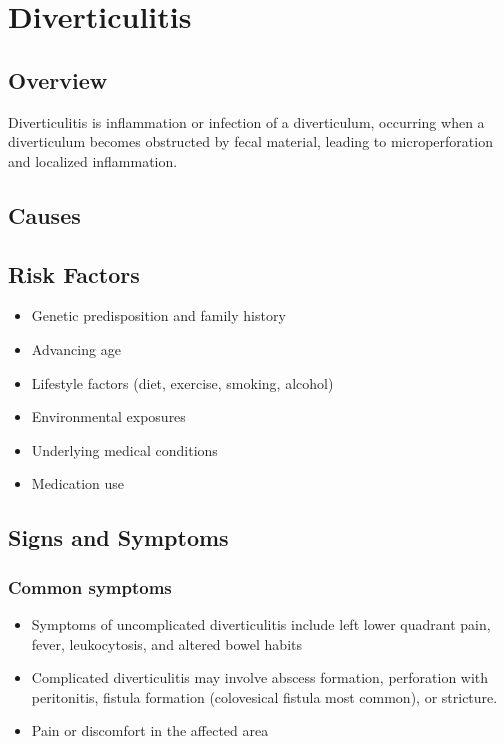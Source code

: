 \chapter{Diverticulitis}
\label{sec:Diverticulitis}

\section{Overview}
Diverticulitis is inflammation or infection of a diverticulum, occurring when a diverticulum becomes obstructed by fecal material, leading to microperforation and localized inflammation.
\section{Causes}
\section{Risk Factors}

\begin{itemize}[noitemsep]
  \item Genetic predisposition and family history
  \item Advancing age
  \item Lifestyle factors (diet, exercise, smoking, alcohol)
  \item Environmental exposures
  \item Underlying medical conditions
  \item Medication use
\end{itemize}
\section{Signs and Symptoms}

\subsection{Common symptoms}
\begin{itemize}[noitemsep]
  \item Symptoms of uncomplicated diverticulitis include left lower quadrant pain, fever, leukocytosis, and altered bowel habits
  \item Complicated diverticulitis may involve abscess formation, perforation with peritonitis, fistula formation (colovesical fistula most common), or stricture.
  \item Pain or discomfort in the affected area
  \end{itemize}

